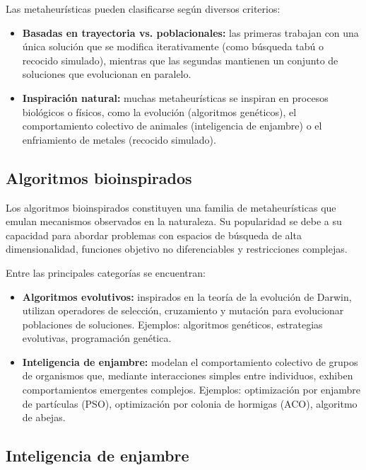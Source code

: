 Las metaheurísticas pueden clasificarse según diversos criterios:

\begin{itemize}
  \item \textbf{Basadas en trayectoria vs. poblacionales:} las
    primeras trabajan con una única solución que se modifica
    iterativamente (como búsqueda tabú o recocido simulado),
    mientras que las segundas mantienen un conjunto de soluciones
    que evolucionan en paralelo.

  \item \textbf{Inspiración natural:} muchas metaheurísticas se
    inspiran en procesos biológicos o físicos, como la evolución
    (algoritmos genéticos), el comportamiento colectivo de animales
    (inteligencia de enjambre) o el enfriamiento de metales (recocido
    simulado).
\end{itemize}

\subsection{Algoritmos bioinspirados}

Los algoritmos bioinspirados constituyen una familia de
metaheurísticas que emulan mecanismos observados en la naturaleza.
Su popularidad se debe a su capacidad para abordar problemas con
espacios de búsqueda de alta dimensionalidad, funciones objetivo no
diferenciables y restricciones complejas.

Entre las principales categorías se encuentran:

\begin{itemize}
  \item \textbf{Algoritmos evolutivos:} inspirados en la teoría de la
    evolución de Darwin, utilizan operadores de selección,
    cruzamiento y mutación para evolucionar poblaciones de
    soluciones. Ejemplos: algoritmos genéticos, estrategias
    evolutivas, programación genética.

  \item \textbf{Inteligencia de enjambre:} modelan el comportamiento
    colectivo de grupos de organismos que, mediante interacciones
    simples entre individuos, exhiben comportamientos emergentes
    complejos. Ejemplos: optimización por enjambre de partículas
    (PSO), optimización por colonia de hormigas (ACO), algoritmo de
    abejas.
\end{itemize}

\subsection{Inteligencia de enjambre}

